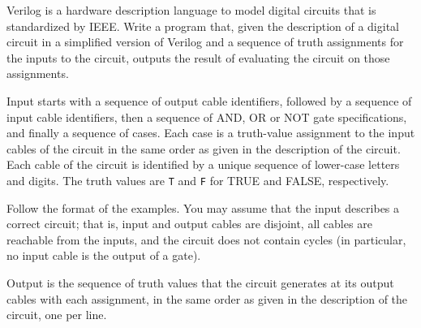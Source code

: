 

\Statement

Verilog is a hardware description language to model digital circuits
that is standardized by IEEE. Write a program that, given the
description of a digital circuit in a simplified version of Verilog
and a sequence of truth assignments for the inputs to the circuit,
outputs the result of evaluating the circuit on those assignments.




\Input

Input starts with a sequence of output cable identifiers, followed by
a sequence of input cable identifiers, then a sequence of AND, OR or
NOT gate specifications, and finally a sequence of cases. Each case is
a truth-value assignment to the input cables of the circuit in the
same order as given in the description of the circuit. Each cable of
the circuit is identified by a unique sequence of lower-case letters
and digits. The truth values are \texttt{T} and \texttt{F} for TRUE
and FALSE, respectively.  \medskip

Follow the format of the examples. You may assume that the input
describes a correct circuit; that is, input and output cables are
disjoint, all cables are reachable from the inputs, and the circuit
does not contain cycles (in particular, no input cable is the output
of a gate).

\Output

Output is the sequence of truth values that the circuit generates at
its output cables with each assignment, in the same order as given in
the description of the circuit, one per line.

\clearpage
\Sample

